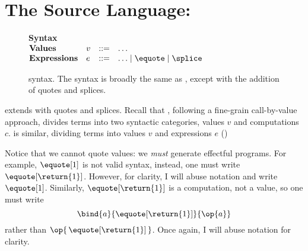 \section{The Source Language: \texorpdfstring{\sourceLang{}}{Lambda-Op-Quote-Splice}}\label{section:source-lang}
\begin{figure}
\begin{source-desc}
  {\large \textbf{Syntax}} \\

  $\begin{array}{@{}llll}
    \textbf{Values} & v & ::= & \ldots \\
    \textbf{Expressions} & e & ::= & \ldots \mid \equote \mid \splice
  \end{array}$
\end{source-desc}
\caption{\sourceLang{} syntax. The syntax is broadly the same as \efflang{}, except with the addition of quotes and splices.}
\label{fig:source-syntax}
\end{figure}
\sourceLang{} extends \efflang{} with quotes and splices. Recall that \efflang{}, following a fine-grain call-by-value approach, divides terms into two syntactic categories, values $v$ and computations $c$. \sourceLang{} is similar, dividing terms into values $v$ and expressions $e$ ()

Notice that we cannot quote values: we \textit{must} generate effectful programs. For example, $\equote[1]$ is not valid syntax, instead, one must write $\equote[\return{1}]$. However, for clarity, I will abuse notation and write $\equote[1]$. Similarly, $\equote[\return{1}]$ is a computation, not a value, so one must write 
\[\bind{a}{\equote[\return{1}]}{\op{a}}\]
rather than $\op{\, \equote[\return{1}] \,}$. Once again, I will abuse notation for clarity.

